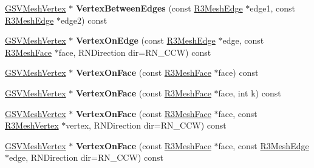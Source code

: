 \begin{DoxyCompactItemize}
\item 
\hyperlink{class_g_s_v_mesh_vertex}{G\+S\+V\+Mesh\+Vertex} $\ast$ {\bfseries Vertex\+Between\+Edges} (const \hyperlink{class_r3_mesh_edge}{R3\+Mesh\+Edge} $\ast$edge1, const \hyperlink{class_r3_mesh_edge}{R3\+Mesh\+Edge} $\ast$edge2) const \hypertarget{class_g_s_v_mesh_ab9813be1dd59e798e8ab4354210408ff}{}\label{class_g_s_v_mesh_ab9813be1dd59e798e8ab4354210408ff}

\item 
\hyperlink{class_g_s_v_mesh_vertex}{G\+S\+V\+Mesh\+Vertex} $\ast$ {\bfseries Vertex\+On\+Edge} (const \hyperlink{class_r3_mesh_edge}{R3\+Mesh\+Edge} $\ast$edge, const \hyperlink{class_r3_mesh_face}{R3\+Mesh\+Face} $\ast$face, R\+N\+Direction dir=R\+N\+\_\+\+C\+CW) const \hypertarget{class_g_s_v_mesh_a3691d027a79c6bade16de6186860df06}{}\label{class_g_s_v_mesh_a3691d027a79c6bade16de6186860df06}

\item 
\hyperlink{class_g_s_v_mesh_vertex}{G\+S\+V\+Mesh\+Vertex} $\ast$ {\bfseries Vertex\+On\+Face} (const \hyperlink{class_r3_mesh_face}{R3\+Mesh\+Face} $\ast$face) const \hypertarget{class_g_s_v_mesh_a47c840cfca3849706b7227fe84f850bc}{}\label{class_g_s_v_mesh_a47c840cfca3849706b7227fe84f850bc}

\item 
\hyperlink{class_g_s_v_mesh_vertex}{G\+S\+V\+Mesh\+Vertex} $\ast$ {\bfseries Vertex\+On\+Face} (const \hyperlink{class_r3_mesh_face}{R3\+Mesh\+Face} $\ast$face, int k) const \hypertarget{class_g_s_v_mesh_aab837bdf946fab5e7824bd035f3a5004}{}\label{class_g_s_v_mesh_aab837bdf946fab5e7824bd035f3a5004}

\item 
\hyperlink{class_g_s_v_mesh_vertex}{G\+S\+V\+Mesh\+Vertex} $\ast$ {\bfseries Vertex\+On\+Face} (const \hyperlink{class_r3_mesh_face}{R3\+Mesh\+Face} $\ast$face, const \hyperlink{class_r3_mesh_vertex}{R3\+Mesh\+Vertex} $\ast$vertex, R\+N\+Direction dir=R\+N\+\_\+\+C\+CW) const \hypertarget{class_g_s_v_mesh_a34f061f3d367bab9a4541f84ba31aa3e}{}\label{class_g_s_v_mesh_a34f061f3d367bab9a4541f84ba31aa3e}

\item 
\hyperlink{class_g_s_v_mesh_vertex}{G\+S\+V\+Mesh\+Vertex} $\ast$ {\bfseries Vertex\+On\+Face} (const \hyperlink{class_r3_mesh_face}{R3\+Mesh\+Face} $\ast$face, const \hyperlink{class_r3_mesh_edge}{R3\+Mesh\+Edge} $\ast$edge, R\+N\+Direction dir=R\+N\+\_\+\+C\+CW) const \hypertarget{class_g_s_v_mesh_a3b1caffaaa2ec1d7dcd056b36a161830}{}\label{class_g_s_v_mesh_a3b1caffaaa2ec1d7dcd056b36a161830}


\end{DoxyCompactItemize}
